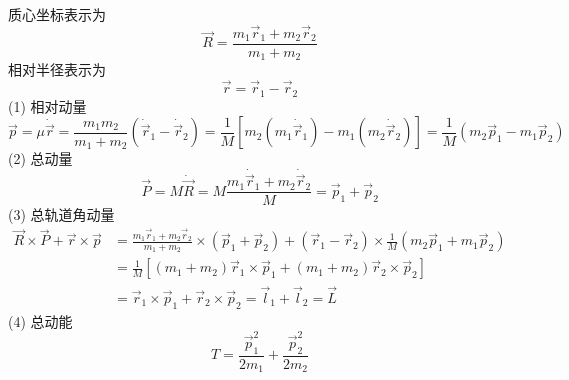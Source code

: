 \begin{solution}
    质心坐标表示为
    $$
        \vec{R}=\frac{m_1\vec{r}_1+m_2\vec{r}_2}{m_1+m_2}
    $$
    相对半径表示为
    $$
        \vec{r}=\vec{r}_1-\vec{r}_2
    $$
    (1) 相对动量
    $$
        \vec{p}=\mu\dot{\vec{r}}
        =\frac{m_1m_2}{m_1+m_2}\left(\dot{\vec{r}}_1-\dot{\vec{r}}_2\right)
        =\frac{1}{M}[m_2(m_1\dot{\vec{r}}_1)-m_1(m_2\dot{\vec{r}}_2)]
        =\frac{1}{M}(m_2\vec{p}_1-m_1\vec{p}_2)
    $$
    (2) 总动量
    $$
        \vec{P}=M\dot{\vec{R}}
        =M\frac{m_1\dot{\vec{r}}_1+m_2\dot{\vec{r}}_2}{M}
        =\vec{p}_1+\vec{p}_2
    $$
    (3) 总轨道角动量
    $$
        \begin{aligned}
            \vec{R}\times\vec{P}+\vec{r}\times\vec{p}
             & =\frac{m_1\vec{r}_1+m_2\vec{r}_2}{m_1+m_2}\times\left(\vec{p}_1+\vec{p}_2\right)
            +\left(\vec{r}_1-\vec{r}_2\right)\times\frac{1}{M}\left(m_2\vec{p}_1+m_1\vec{p}_2\right) \\
             & =\frac{1}{M}[(m_1+m_2)\vec{r}_1\times\vec{p}_1 + (m_1+m_2)\vec{r}_2\times\vec{p}_2]   \\
             & =\vec{r}_1\times\vec{p}_1+\vec{r}_2\times\vec{p}_2=\vec{l}_1+\vec{l}_2=\vec{L}
        \end{aligned}
    $$
    (4) 总动能
    $$
        T=\frac{\vec{p}_1^2}{2m_1}+\frac{\vec{p}_2^2}{2m_2}
    $$
\end{solution}

